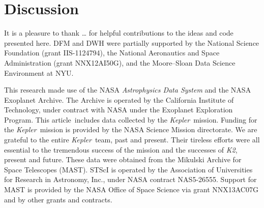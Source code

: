 \documentclass[12pt,preprint]{aastex}
\newcommand{\project}[1]{\textsl{#1}}
\newcommand{\kepler}{\project{Kepler}}
\newcommand{\KT}{\project{K2}}
\newcommand{\paper}{article}
\renewcommand{\eqref}[1]{\ref{eq:#1}}
\newcommand{\sectlabel}[1]{\label{sect:#1}}
\newcommand{\dd}{\ensuremath{\,\mathrm{d}}}
\newcommand{\period}{{\ensuremath{P}}}
\newcommand{\rp}{{\ensuremath{R_\mathrm{P}}}}
\newcommand{\rate}{{\ensuremath{\Gamma}}}
\begin{document}


\section{Discussion}\sectlabel{discussion}




\acknowledgments
It is a pleasure to thank
\ldots
for helpful contributions to the ideas and code presented here.
DFM and DWH were partially supported by the National Science Foundation
(grant IIS-1124794),
the National Aeronautics and Space Administration
(grant NNX12AI50G), and the Moore--Sloan Data Science Environment at NYU.

This research made use of the NASA \project{Astrophysics Data System} and the
NASA Exoplanet Archive.
The Archive is operated by the California Institute of Technology, under
contract with NASA under the Exoplanet Exploration Program.
This \paper\ includes data collected by the \kepler\ mission. Funding for the
\kepler\ mission is provided by the NASA Science Mission directorate.
We are grateful to the entire \kepler\ team, past and present.
Their tireless efforts were all essential to the tremendous success of the mission
and the successes of \KT, present and future.
These data were obtained from the Mikulski Archive for Space Telescopes
(MAST).
STScI is operated by the Association of Universities for Research in
Astronomy, Inc., under NASA contract NAS5-26555.
Support for MAST is provided by the NASA Office of Space Science via grant
NNX13AC07G and by other grants and contracts.
\end{document}
